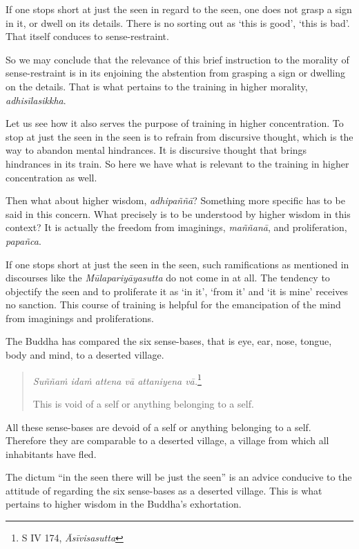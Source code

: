 If one stops short at just the seen in regard to the seen, one does not grasp a sign in it, or dwell on its details. There is no sorting out as `this is good', `this is bad'. That itself conduces to sense-restraint.

So we may conclude that the relevance of this brief instruction to the morality of sense-restraint is in its enjoining the abstention from grasping a sign or dwelling on the details. That is what pertains to the training in higher morality, \emph{adhisīlasikkha}.

Let us see how it also serves the purpose of training in higher concentration. To stop at just the seen in the seen is to refrain from discursive thought, which is the way to abandon mental hindrances. It is discursive thought that brings hindrances in its train. So here we have what is relevant to the training in higher concentration as well.

Then what about higher wisdom, \emph{adhipaññā}? Something more specific has to be said in this concern. What precisely is to be understood by higher wisdom in this context? It is actually the freedom from imaginings, \emph{maññanā}, and proliferation, \emph{papañca}.

If one stops short at just the seen in the seen, such ramifications as mentioned in discourses like the \emph{Mūlapariyāyasutta} do not come in at all. The tendency to objectify the seen and to proliferate it as `in it', `from it' and `it is mine' receives no sanction. This course of training is helpful for the emancipation of the mind from imaginings and proliferations.

The Buddha has compared the six sense-bases, that is eye, ear, nose, tongue, body and mind, to a deserted village.

\begin{quote}
\emph{Suññaṁ idaṁ attena vā attaniyena vā.}\footnote{S IV 174, \emph{Āsīvisasutta}}

This is void of a self or anything belonging to a self.
\end{quote}

All these sense-bases are devoid of a self or anything belonging to a self. Therefore they are comparable to a deserted village, a village from which all inhabitants have fled.

The dictum ``in the seen there will be just the seen'' is an advice conducive to the attitude of regarding the six sense-bases as a deserted village. This is what pertains to higher wisdom in the Buddha's exhortation.

